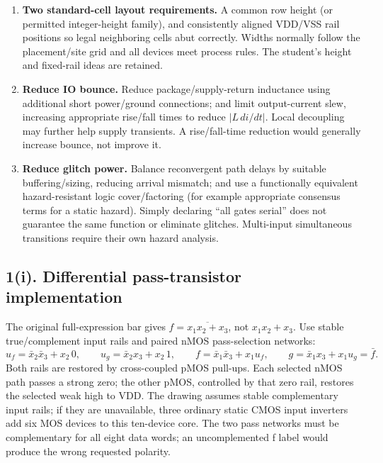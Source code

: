 \documentclass[10pt]{article}
\begin{document}
\begin{enumerate}[label=(\alph*),leftmargin=7mm,itemsep=7pt]
\item \textbf{Two standard-cell layout requirements.} A common row height (or permitted integer-height family), and consistently aligned VDD/VSS rail positions so legal neighboring cells abut correctly. Widths normally follow the placement/site grid and all devices meet process rules. The student's height and fixed-rail ideas are retained.
\item \textbf{Reduce IO bounce.} Reduce package/supply-return inductance using additional short power/ground connections; and limit output-current slew, increasing appropriate rise/fall times to reduce $|L\,di/dt|$. Local decoupling may further help supply transients. A rise/fall-time reduction would generally increase bounce, not improve it.
\item \textbf{Reduce glitch power.} Balance reconvergent path delays by suitable buffering/sizing, reducing arrival mismatch; and use a functionally equivalent hazard-resistant logic cover/factoring (for example appropriate consensus terms for a static hazard). Simply declaring ``all gates serial'' does not guarantee the same function or eliminate glitches. Multi-input simultaneous transitions require their own hazard analysis.
\end{enumerate}
\newpage\subsection*{1(i). Differential pass-transistor implementation}
The original full-expression bar gives $f=\overline{x_1x_2+x_3}$, not $x_1x_2+x_3$. Use stable true/complement input rails and paired nMOS pass-selection networks:
\[
u_f=\bar x_2\bar x_3+x_2\,0,\qquad u_g=\bar x_2x_3+x_2\,1,
\qquad f=\bar x_1\bar x_3+x_1u_f,\qquad g=\bar x_1x_3+x_1u_g=\bar f.
\]
Both rails are restored by cross-coupled pMOS pull-ups. Each selected nMOS path passes a strong zero; the other pMOS, controlled by that zero rail, restores the selected weak high to VDD. The drawing assumes stable complementary input rails; if they are unavailable, three ordinary static CMOS input inverters add six MOS devices to this ten-device core. The two pass networks must be complementary for all eight data words; an uncomplemented f label would produce the wrong requested polarity.
\providecommand{\auditmos}[4]{\begin{scope}[shift={(#1,#2)}]
\draw (0,.24)--(0,-.24);\draw (0,.20)--(.25,.20)--(.25,.5);
\draw (0,-.20)--(.25,-.20)--(.25,-.5);\draw (-.16,.23)--(-.16,-.23);
\ifnum#4=1\draw (-.26,0) circle (.06);\draw (-.75,0)--(-.32,0);
\else\draw (-.75,0)--(-.16,0);\fi
\node[anchor=east] at (-.76,0) {$#3$};\end{scope}}
\end{document}
